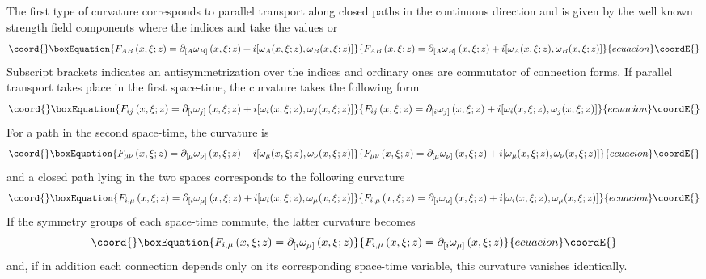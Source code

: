 \documentclass[12pt,a4paper]{article}
\begin{document}
The first type of curvature corresponds to parallel transport along closed
paths in the continuous direction and is given by the well known strength
field \coordHE{}
components where the indices \coordHE{} and \coordHE{} take the values \coordHE{} or \myHighlight{$\mu$}\coordHE{}
\begin{equation}\coord{}\boxEquation{
F_{AB}\left(  x,\xi;z\right)  =\partial_{\lbrack A}\omega_{B]}\left(
x,\xi;z\right)  +i[\omega_{A}(x,\xi;z),\omega_{B}(x,\xi;z)]
}{
F_{AB}\left(  x,\xi;z\right)  =\partial_{\lbrack A}\omega_{B]}\left(
x,\xi;z\right)  +i[\omega_{A}(x,\xi;z),\omega_{B}(x,\xi;z)]
}{ecuacion}\coordE{}\end{equation}
Subscript brackets \myHighlight{$[,]$}\coordHE{} indicates an antisymmetrization over the indices and
ordinary ones are commutator of connection forms. If parallel transport takes
place in the first space-time, the curvature takes the following form
\begin{equation}\coord{}\boxEquation{
F_{ij}\left(  x,\xi;z\right)  =\partial_{\lbrack i}\omega_{j]}\left(
x,\xi;z\right)  +i[\omega_{i}(x,\xi;z),\omega_{j}(x,\xi;z)]
}{
F_{ij}\left(  x,\xi;z\right)  =\partial_{\lbrack i}\omega_{j]}\left(
x,\xi;z\right)  +i[\omega_{i}(x,\xi;z),\omega_{j}(x,\xi;z)]
}{ecuacion}\coordE{}\end{equation}
For a path in the second space-time, the curvature is
\begin{equation}\coord{}\boxEquation{
F_{\mu\nu}\left(  x,\xi;z\right)  =\partial_{\lbrack\mu}\omega_{\nu]}\left(
x,\xi;z\right)  +i[\omega_{\mu}(x,\xi;z),\omega_{\nu}(x,\xi;z)]
}{
F_{\mu\nu}\left(  x,\xi;z\right)  =\partial_{\lbrack\mu}\omega_{\nu]}\left(
x,\xi;z\right)  +i[\omega_{\mu}(x,\xi;z),\omega_{\nu}(x,\xi;z)]
}{ecuacion}\coordE{}\end{equation}
and a closed path lying in the two spaces corresponds to the following
curvature
\begin{equation}\coord{}\boxEquation{
F_{i,\mu}\left(  x,\xi;z\right)  =\partial_{\lbrack i}\omega_{\mu]}\left(
x,\xi;z\right)  +i[\omega_{i}(x,\xi;z),\omega_{\mu}(x,\xi;z)]
}{
F_{i,\mu}\left(  x,\xi;z\right)  =\partial_{\lbrack i}\omega_{\mu]}\left(
x,\xi;z\right)  +i[\omega_{i}(x,\xi;z),\omega_{\mu}(x,\xi;z)]
}{ecuacion}\coordE{}\end{equation}
If the symmetry groups of each space-time commute, the latter curvature
becomes
\begin{equation}\coord{}\boxEquation{
F_{i,\mu}\left(  x,\xi;z\right)  =\partial_{\lbrack i}\omega_{\mu]}\left(
x,\xi;z\right)
}{
F_{i,\mu}\left(  x,\xi;z\right)  =\partial_{\lbrack i}\omega_{\mu]}\left(
x,\xi;z\right)
}{ecuacion}\coordE{}\end{equation}
and, if in addition each connection depends only on its corresponding
space-time variable, this curvature vanishes identically.
\end{document}

